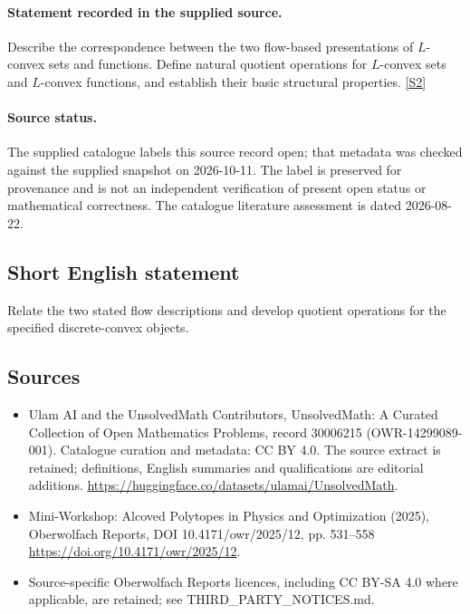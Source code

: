 \documentclass[11pt]{article}
\begin{document}
\paragraph{Statement recorded in the supplied source.}
Describe the correspondence between the two flow-based presentations of $L$-convex sets and functions. Define natural quotient operations for $L$-convex sets and $L$-convex functions, and establish their basic structural properties. \href{https://doi.org/10.4171/owr/2025/12}{[S2]}
\paragraph{Source status.}
The supplied catalogue labels this source record open; that metadata was checked against the supplied snapshot on 2026-10-11. The label is preserved for provenance and is not an independent verification of present open status or mathematical correctness. The catalogue literature assessment is dated 2026-08-22.
\subsection{Short English statement}
Relate the two stated flow descriptions and develop quotient operations for the specified discrete-convex objects.
\subsection{Sources}
\begin{itemize}
\item[S1] Ulam AI and the UnsolvedMath Contributors, UnsolvedMath: A Curated Collection of Open Mathematics Problems, record 30006215 (OWR-14299089-001). Catalogue curation and metadata: CC BY 4.0. The source extract is retained; definitions, English summaries and qualifications are editorial additions.
\url{https://huggingface.co/datasets/ulamai/UnsolvedMath}.
\item[S2] Mini-Workshop: Alcoved Polytopes in Physics and Optimization (2025), Oberwolfach Reports, DOI 10.4171/owr/2025/12, pp. 531--558
\url{https://doi.org/10.4171/owr/2025/12}.
\item Source-specific Oberwolfach Reports licences, including CC BY-SA 4.0 where applicable, are retained; see THIRD\_PARTY\_NOTICES.md.
\end{itemize}
\end{document}
